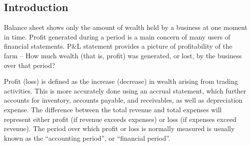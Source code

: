 \documentclass[
]{article}
\begin{document}
\hypertarget{introduction-2}{%
\subsection*{Introduction}\label{introduction-2}}

Balance sheet shows only the amount of wealth held by a business at one moment in time. Profit generated during a period is a main concern of many users of financial statements. P\&L statement provides a picture of profitability of the farm -- How much wealth (that is, profit) was generated, or lost, by the business over that period?

Profit (loss) is defined as the increase (decrease) in wealth arising from trading activities. This is more accurately done using an accrual statement, which further accounts for inventory, accounts payable, and receivables, as well as depreciation expense. The difference between the total revenue and total expenses will represent either profit (if revenue exceeds expenses) or loss (if expenses exceed revenue). The period over which profit or loss is normally measured is usually known as the ``accounting period'', or ``financial period''.
\end{document}
